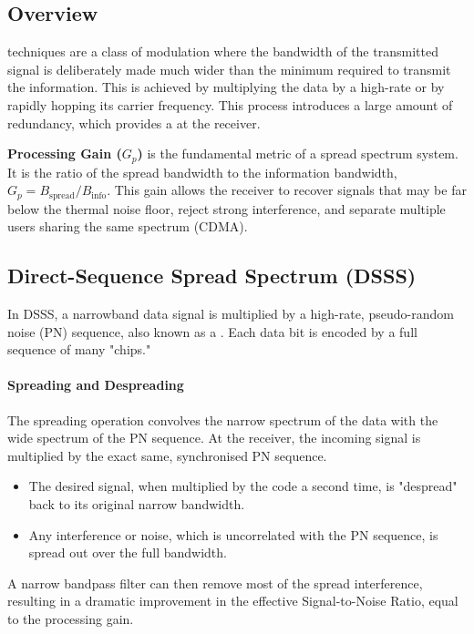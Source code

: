 \subsection{Overview}

 techniques are a class of modulation where the bandwidth of the transmitted signal is deliberately made much wider than the minimum required to transmit the information. This is achieved by multiplying the data by a high-rate  or by rapidly hopping its carrier frequency. This process introduces a large amount of redundancy, which provides a  at the receiver.

\begin{keyconcept}
    \textbf{Processing Gain ($G_p$)} is the fundamental metric of a spread spectrum system. It is the ratio of the spread bandwidth to the information bandwidth, $G_p = B_{\text{spread}} / B_{\text{info}}$. This gain allows the receiver to recover signals that may be far below the thermal noise floor, reject strong interference, and separate multiple users sharing the same spectrum (CDMA).
\end{keyconcept}


\subsection{Direct-Sequence Spread Spectrum (DSSS)}

In DSSS, a narrowband data signal is multiplied by a high-rate, pseudo-random noise (PN) sequence, also known as a . Each data bit is encoded by a full sequence of many "chips."

\paragraph{Spreading and Despreading}
The spreading operation convolves the narrow spectrum of the data with the wide spectrum of the PN sequence. At the receiver, the incoming signal is multiplied by the exact same, synchronised PN sequence.
\begin{itemize}
    \item The desired signal, when multiplied by the code a second time, is "despread" back to its original narrow bandwidth.
    \item Any interference or noise, which is uncorrelated with the PN sequence, is spread out over the full bandwidth.
\end{itemize}
A narrow bandpass filter can then remove most of the spread interference, resulting in a dramatic improvement in the effective Signal-to-Noise Ratio, equal to the processing gain.

